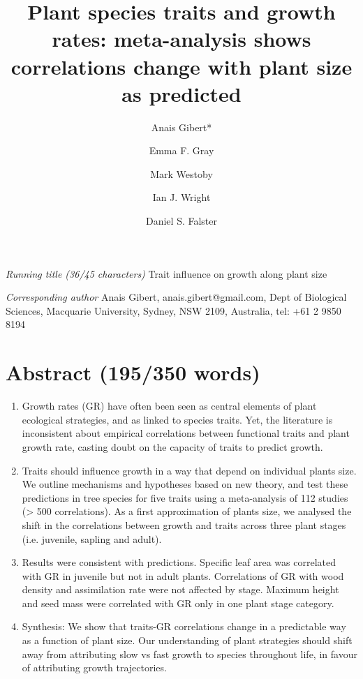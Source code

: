 \documentclass[a4paper]{article}\usepackage[]{graphicx}\usepackage[]{color}
\begin{document}
\clearpage

\title{Plant species traits and growth rates: meta-analysis shows correlations change with plant size as predicted}

\author[1]{Anais Gibert*}
\author[1]{Emma F. Gray}
\author[1]{Mark Westoby}
\author[1]{Ian J. Wright}
\author[1]{Daniel S. Falster}




\maketitle

\textit{Running title (36/45 characters)} Trait influence on growth along plant size

\textit{Corresponding author} Anais Gibert, anais.gibert@gmail.com, Dept of Biological Sciences, Macquarie University, Sydney, NSW 2109, Australia, tel: +61 2 9850 8194


\clearpage

\section*{Abstract (195/350 words)}\label{abstract}


\begin{enumerate}

\item
Growth rates (GR) have often been seen as central elements of plant ecological strategies, and as linked to species traits. Yet, the literature is inconsistent about empirical correlations between functional traits and plant growth rate, casting doubt on the capacity of traits to predict growth.

\item 
Traits should influence growth in a way that depend on individual plants size. We outline mechanisms and hypotheses based on new theory, and test these predictions in tree species for five traits using a meta-analysis of 112 studies (> 500 correlations). As a first approximation of plants size, we analysed the shift in the correlations between growth and traits across three plant stages (i.e. juvenile, sapling and adult).

\item
Results were consistent with predictions. Specific leaf area was correlated with GR in juvenile but not in adult plants. Correlations of GR with wood density and assimilation rate were not affected by stage. Maximum height and seed mass were correlated with GR only in one plant stage category.

\item 
Synthesis: We show that traits-GR correlations change in a predictable way as a function of plant size. Our understanding of plant strategies should shift away from attributing slow vs fast growth to species throughout life, in favour of attributing growth trajectories.

\end{enumerate}
\end{document}
